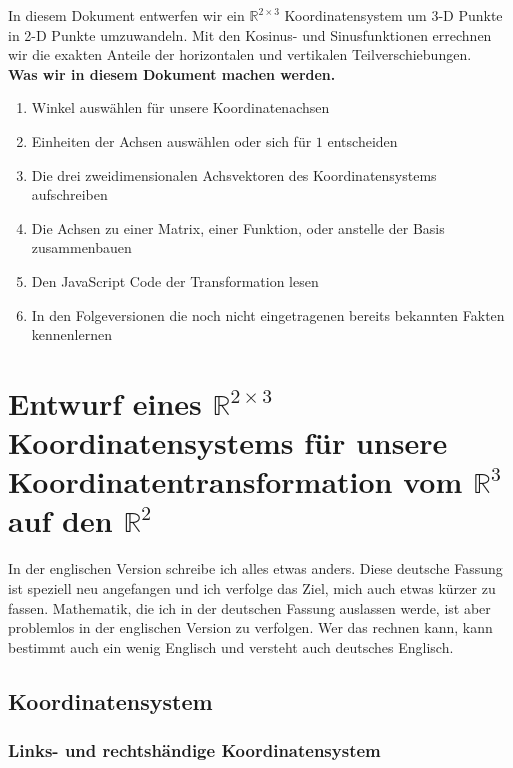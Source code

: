 \documentclass[a4paper]{article}
\begin{document}
In diesem Dokument entwerfen wir ein $\mathbb{R}^{2\times{3}}$ Koordinatensystem um 3-D Punkte in 2-D Punkte umzuwandeln.
Mit den Kosinus- und Sinusfunktionen errechnen wir die exakten Anteile der horizontalen und vertikalen Teilverschiebungen.\\

\textbf{Was wir in diesem Dokument machen werden.}

\begin{enumerate}
\item Winkel ausw\"ahlen f\"ur unsere Koordinatenachsen 
\item Einheiten der Achsen ausw\"ahlen oder sich f\"ur $1$ entscheiden
\item Die drei zweidimensionalen Achsvektoren des Koordinatensystems aufschreiben
\item Die Achsen zu einer Matrix, einer Funktion, oder anstelle der Basis zusammenbauen
\item Den JavaScript Code der Transformation lesen
\item In den Folgeversionen die noch nicht eingetragenen bereits bekannten Fakten kennenlernen

\end{enumerate}


\section{Entwurf eines $\mathbb{R}^{2\times{3}}$ Koordinatensystems f\"ur unsere Koordinatentransformation vom $\mathbb{R}^{3}$ auf den $\mathbb{R}^{2}$}

In der englischen Version schreibe ich alles etwas anders. Diese deutsche Fassung ist speziell neu angefangen und ich verfolge das
Ziel, mich auch etwas k\"urzer zu fassen. Mathematik, die ich in der deutschen Fassung auslassen werde, ist aber problemlos in der
englischen Version zu verfolgen. Wer das rechnen kann, kann bestimmt auch ein wenig Englisch und versteht auch deutsches Englisch.\\

\subsection{Koordinatensystem}
\subsubsection{Links- und rechtsh\"andige Koordinatensystem}
\end{document}
